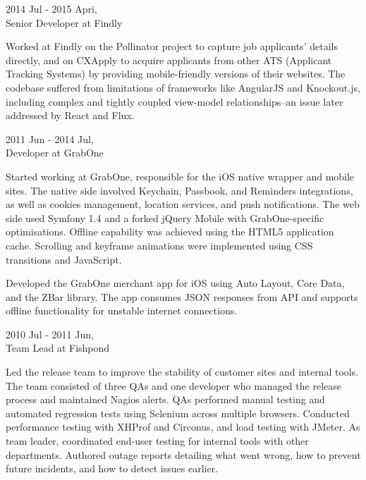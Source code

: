 \begin{resume}
\hspace*{-0.25in} 2014 Jul - 2015 Apri,\\
\hspace*{-0.25in} Senior Developer at Findly

Worked at Findly on the Pollinator project to capture job applicants' details directly, and on CXApply to acquire applicants from other ATS (Applicant Tracking Systems) by providing mobile-friendly versions of their websites. The codebase suffered from limitations of frameworks like AngularJS and Knockout.js, including complex and tightly coupled view-model relationships--an issue later addressed by React and Flux.

\begin{minipage}{\textwidth}
\vspace{0.03in}
\hspace*{-0.25in} 2011 Jun - 2014 Jul,\\
\hspace*{-0.25in} Developer at GrabOne
\vspace{0.165in}

Started working at GrabOne, responsible for the iOS native wrapper and mobile sites. The native side involved Keychain, Passbook, and Reminders integrations, as well as cookies management, location services, and push notifications. The web side used Symfony 1.4 and a forked jQuery Mobile with GrabOne-specific optimisations. Offline capability was achieved using the HTML5 application cache. Scrolling and keyframe animations were implemented using CSS transitions and JavaScript.
\end{minipage}

\begin{minipage}{\textwidth}
Developed the GrabOne merchant app for iOS using Auto Layout, Core Data, and the ZBar library. The app consumes JSON responses from API and supports offline functionality for unstable internet connections.
\vspace{0.03in}
\end{minipage}

\hspace*{-0.25in} 2010 Jul - 2011 Jun,\\
\hspace*{-0.25in} Team Lead at Fishpond

Led the release team to improve the stability of customer sites and internal tools. The team consisted of three QAs and one developer who managed the release process and maintained Nagios alerts. QAs performed manual testing and automated regression tests using Selenium across multiple browsers. Conducted performance testing with XHProf and Circonus, and load testing with JMeter. As team leader, coordinated end-user testing for internal tools with other departments. Authored outage reports detailing what went wrong, how to prevent future incidents, and how to detect issues earlier.


\end{resume}
